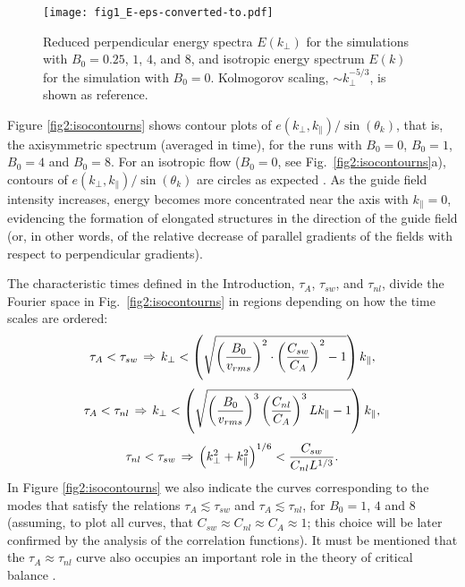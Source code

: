 \documentclass[aip,pop,reprint,amsmath,amssymb,floatfix]{revtex4-1}
\begin{document}
\begin{figure}
  \centering
  \texttt{[image: fig1\_E-eps-converted-to.pdf]}
  \caption{Reduced perpendicular energy spectra $E(k_\perp)$ for the
    simulations with $B_0=0.25$, $1$, $4$, and $8$, and isotropic energy
    spectrum $E(k)$ for the simulation with $B_0=0$. Kolmogorov
    scaling, $\sim k_\perp^{-5/3}$, is shown as reference.}
  \label{fig1:E}
\end{figure}


Figure \ref{fig2:isocontourns} shows contour plots of
$e(k_\perp,k_\parallel)/\sin(\theta_k)$, that is, the axisymmetric
spectrum (averaged in time), for the runs with $B_0=0$, $B_0=1$,
$B_0=4$ and $B_0=8$. For an isotropic flow ($B_0=0$, see
Fig.~\ref{fig2:isocontourns}a), contours of
$e(k_\perp,k_\parallel)/\sin(\theta_k)$ are circles as expected
\cite{mininni_isotropization_2012}. As the guide field intensity
increases, energy becomes more concentrated near the axis with
$k_\parallel=0$, evidencing the formation of elongated structures in
the direction of the guide field (or, in other words, of the relative
decrease of parallel gradients of the fields with respect to
perpendicular gradients).

The characteristic times defined in the Introduction, $\tau_A$,
$\tau_{sw}$, and $\tau_{nl}$, divide the Fourier space in
Fig.~\ref{fig2:isocontourns} in regions depending on how the
time scales are ordered:
\begin{equation}\label{eq:Asw} \tau_A < \tau_{sw} \hspace{0.05cm}
\Rightarrow \hspace{0.05cm} k_\perp <
\left(\sqrt{\left(\frac{B_0}{v_{rms}}\right)^2 \cdot
\left(\frac{C_{sw}}{C_A}\right)^2 - 1} \right) k_\parallel,
\end{equation}
\begin{equation}\label{eq:Anl} \tau_A < \tau_{nl} \hspace{0.05cm}
\Rightarrow \hspace{0.05cm} k_\perp <
\left(\sqrt{\left(\frac{B_0}{v_{rms}}\right)^3
\left(\frac{C_{nl}}{C_A}\right)^3 Lk_\parallel - 1} \right) 
k_\parallel,
\end{equation}
\begin{equation}\label{eq:nlsw} \tau_{nl} < \tau_{sw} \hspace{0.05cm}
\Rightarrow \hspace{0.05cm} \left( k_\perp^2 + k_\parallel^2
\right)^{1/6} < \frac{C_{sw}}{C_{nl}L^{1/3}}.
\end{equation}
In Figure \ref{fig2:isocontourns} we also indicate the curves
corresponding to the modes that satisfy the relations
$\tau_A\lesssim\tau_{sw}$ and $\tau_A\lesssim\tau_{nl}$, for $B_0=1$,
$4$ and $8$ (assuming, to plot all curves, that $C_{sw} \approx C_{nl}
\approx C_A \approx 1$; this choice will be later confirmed by the
analysis of the correlation functions). It must be mentioned that the
$\tau_A\approx\tau_{nl}$ curve also occupies an important role in the
theory of critical balance \cite{sridhar_toward_1994}.
\end{document}
